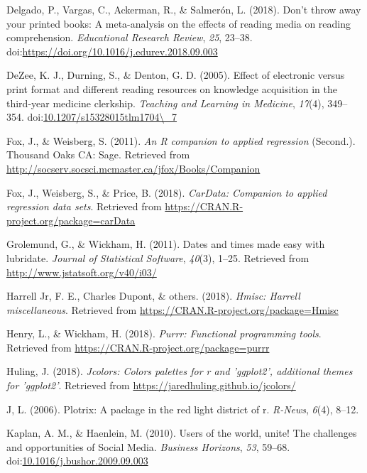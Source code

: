 \documentclass[man, fleqn, noextraspace]{apa6}
\theoremstyle{definition}
\theoremstyle{definition}
\theoremstyle{definition}
\theoremstyle{remark}
\begin{document}
\hypertarget{ref-Delgado2018}{}
Delgado, P., Vargas, C., Ackerman, R., \& Salmerón, L. (2018). Don't
throw away your printed books: A meta-analysis on the effects of reading
media on reading comprehension. \emph{Educational Research Review},
\emph{25}, 23--38.
doi:\href{https://doi.org/https://doi.org/10.1016/j.edurev.2018.09.003}{https://doi.org/10.1016/j.edurev.2018.09.003}

\hypertarget{ref-DeZee2005}{}
DeZee, K. J., Durning, S., \& Denton, G. D. (2005). Effect of electronic
versus print format and different reading resources on knowledge
acquisition in the third-year medicine clerkship. \emph{Teaching and
Learning in Medicine}, \emph{17}(4), 349--354.
doi:\href{https://doi.org/10.1207/s15328015tlm1704/_7}{10.1207/s15328015tlm1704\textbackslash{}\_7}

\hypertarget{ref-R-car}{}
Fox, J., \& Weisberg, S. (2011). \emph{An R companion to applied
regression} (Second.). Thousand Oaks CA: Sage. Retrieved from
\url{http://socserv.socsci.mcmaster.ca/jfox/Books/Companion}

\hypertarget{ref-R-carData}{}
Fox, J., Weisberg, S., \& Price, B. (2018). \emph{CarData: Companion to
applied regression data sets}. Retrieved from
\url{https://CRAN.R-project.org/package=carData}

\hypertarget{ref-R-lubridate}{}
Grolemund, G., \& Wickham, H. (2011). Dates and times made easy with
lubridate. \emph{Journal of Statistical Software}, \emph{40}(3), 1--25.
Retrieved from \url{http://www.jstatsoft.org/v40/i03/}

\hypertarget{ref-R-Hmisc}{}
Harrell Jr, F. E., Charles Dupont, \& others. (2018). \emph{Hmisc:
Harrell miscellaneous}. Retrieved from
\url{https://CRAN.R-project.org/package=Hmisc}

\hypertarget{ref-R-purrr}{}
Henry, L., \& Wickham, H. (2018). \emph{Purrr: Functional programming
tools}. Retrieved from \url{https://CRAN.R-project.org/package=purrr}

\hypertarget{ref-R-jcolors}{}
Huling, J. (2018). \emph{Jcolors: Colors palettes for r and 'ggplot2',
additional themes for 'ggplot2'}. Retrieved from
\url{https://jaredhuling.github.io/jcolors/}

\hypertarget{ref-R-plotrix}{}
J, L. (2006). Plotrix: A package in the red light district of r.
\emph{R-News}, \emph{6}(4), 8--12.

\hypertarget{ref-Kaplan2010}{}
Kaplan, A. M., \& Haenlein, M. (2010). Users of the world, unite! The
challenges and opportunities of Social Media. \emph{Business Horizons},
\emph{53}, 59--68.
doi:\href{https://doi.org/10.1016/j.bushor.2009.09.003}{10.1016/j.bushor.2009.09.003}
\end{document}
